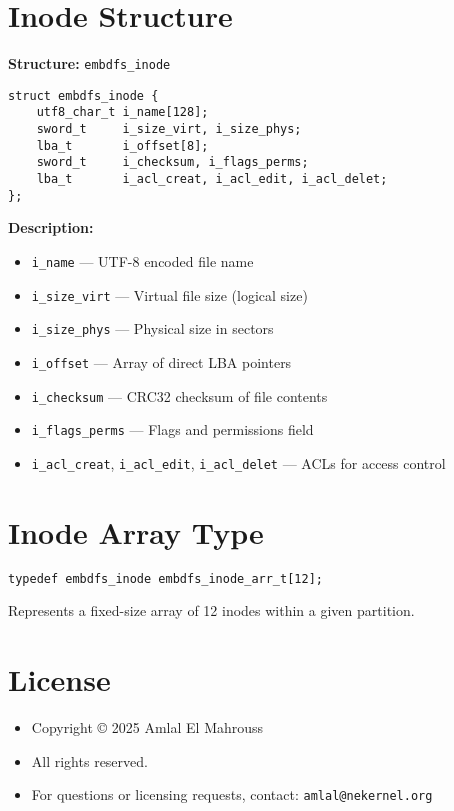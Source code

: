 \documentclass{article}
\begin{document}
\section{Inode Structure}
\textbf{Structure:} \texttt{embdfs\_inode}
\begin{lstlisting}
struct embdfs_inode {
    utf8_char_t i_name[128];
    sword_t     i_size_virt, i_size_phys;
    lba_t       i_offset[8];
    sword_t     i_checksum, i_flags_perms;
    lba_t       i_acl_creat, i_acl_edit, i_acl_delet;
};
\end{lstlisting}

\textbf{Description:}
\begin{itemize}
    \item \texttt{i\_name} — UTF-8 encoded file name
    \item \texttt{i\_size\_virt} — Virtual file size (logical size)
    \item \texttt{i\_size\_phys} — Physical size in sectors
    \item \texttt{i\_offset} — Array of direct LBA pointers
    \item \texttt{i\_checksum} — CRC32 checksum of file contents
    \item \texttt{i\_flags\_perms} — Flags and permissions field
    \item \texttt{i\_acl\_creat}, \texttt{i\_acl\_edit}, \texttt{i\_acl\_delet} — ACLs for access control
\end{itemize}

\section{Inode Array Type}
\begin{lstlisting}
typedef embdfs_inode embdfs_inode_arr_t[12];
\end{lstlisting}
Represents a fixed-size array of 12 inodes within a given partition.

\section{License}
\begin{itemize}
    \item Copyright © 2025 Amlal El Mahrouss
    \item All rights reserved.
    \item For questions or licensing requests, contact: \texttt{amlal@nekernel.org}
\end{itemize}
\end{document}
